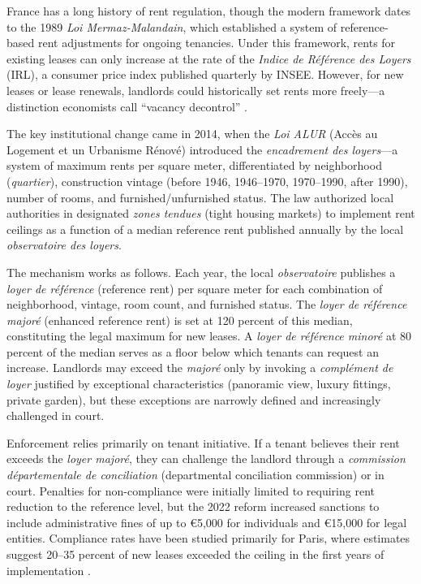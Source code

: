 \documentclass[12pt]{article}
\begin{document}
France has a long history of rent regulation, though the modern framework dates to the 1989 \emph{Loi Mermaz-Malandain}, which established a system of reference-based rent adjustments for ongoing tenancies. Under this framework, rents for existing leases can only increase at the rate of the \emph{Indice de R\'ef\'erence des Loyers} (IRL), a consumer price index published quarterly by INSEE. However, for new leases or lease renewals, landlords could historically set rents more freely---a distinction economists call ``vacancy decontrol'' \citep{arnott1995tenancy}.

The key institutional change came in 2014, when the \emph{Loi ALUR} (Acc\`es au Logement et un Urbanisme R\'enov\'e) introduced the \emph{encadrement des loyers}---a system of maximum rents per square meter, differentiated by neighborhood (\emph{quartier}), construction vintage (before 1946, 1946--1970, 1970--1990, after 1990), number of rooms, and furnished/unfurnished status. The law authorized local authorities in designated \emph{zones tendues} (tight housing markets) to implement rent ceilings as a function of a median reference rent published annually by the local \emph{observatoire des loyers}.

The mechanism works as follows. Each year, the local \emph{observatoire} publishes a \emph{loyer de r\'ef\'erence} (reference rent) per square meter for each combination of neighborhood, vintage, room count, and furnished status. The \emph{loyer de r\'ef\'erence major\'e} (enhanced reference rent) is set at 120 percent of this median, constituting the legal maximum for new leases. A \emph{loyer de r\'ef\'erence minor\'e} at 80 percent of the median serves as a floor below which tenants can request an increase. Landlords may exceed the \emph{major\'e} only by invoking a \emph{compl\'ement de loyer} justified by exceptional characteristics (panoramic view, luxury fittings, private garden), but these exceptions are narrowly defined and increasingly challenged in court.

Enforcement relies primarily on tenant initiative. If a tenant believes their rent exceeds the \emph{loyer major\'e}, they can challenge the landlord through a \emph{commission d\'epartementale de conciliation} (departmental conciliation commission) or in court. Penalties for non-compliance were initially limited to requiring rent reduction to the reference level, but the 2022 reform increased sanctions to include administrative fines of up to \euro{5,000} for individuals and \euro{15,000} for legal entities. Compliance rates have been studied primarily for Paris, where estimates suggest 20--35 percent of new leases exceeded the ceiling in the first years of implementation \citep{bonnefoy2021encadrement}.
\end{document}
